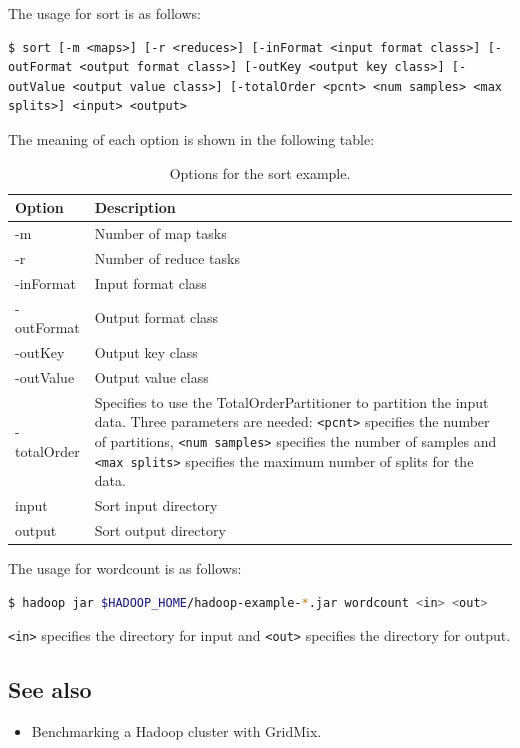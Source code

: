 The usage for sort is as follows: 
\lstset{style=bashstyle}
\begin{lstlisting}
$ sort [-m <maps>] [-r <reduces>] [-inFormat <input format class>] [-outFormat <output format class>] [-outKey <output key class>] [-outValue <output value class>] [-totalOrder <pcnt> <num samples> <max splits>] <input> <output>
\end{lstlisting}

The meaning of each option is shown in the following table:
\begin{table}[ht]
  \centering
  \begin{tabular}{ll}
    \toprule
    \textbf{Option} & \textbf{Description} \\ \midrule
      -m & Number of map tasks \\
      -r & Number of reduce tasks \\
      -inFormat & Input format class \\
      -outFormat & Output format class \\
      -outKey & Output key class \\
      -outValue & Output value class \\
      -totalOrder & \begin{minipage}[t]{0.8\textwidth}Specifies to use the TotalOrderPartitioner to partition the input data. Three parameters are needed: \verb|<pcnt>| specifies the number of partitions, \verb|<num samples>| specifies the number of samples and \verb|<max splits>| specifies the maximum number of splits for the data.\end{minipage} \\
      input & Sort input directory \\
      output & Sort output directory \\ \bottomrule
    \end{tabular}
    \caption{Options for the sort example.}\label{tbl:sort}
  \end{table}

The usage for wordcount is as follows:
\lstset{style=bashstyle}
\begin{lstlisting}[language=bash]
$ hadoop jar $HADOOP_HOME/hadoop-example-*.jar wordcount <in> <out>
\end{lstlisting}
\verb|<in>| specifies the directory for input and \verb|<out>| specifies the directory for output.

\subsection*{See also}
\begin{itemize}
  \item Benchmarking a Hadoop cluster with GridMix.
\end{itemize}
